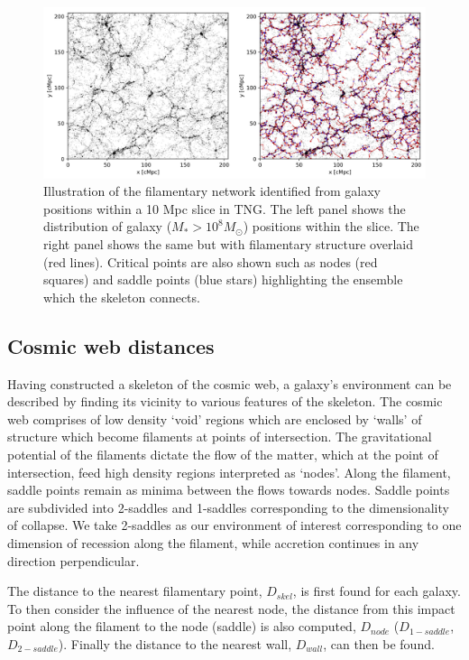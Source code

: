 \begin{figure}
	\includegraphics[width=\linewidth]{dyn_mod_files/TNG300-1-SM10-8-slice-galaxy-density-skeleton-comparison.png}
    \caption{Illustration of the filamentary network identified from galaxy positions within a 10 Mpc slice in TNG. The left panel shows the distribution of galaxy ($M_{\ast} > 10^{8}M_{\odot}$) positions within the slice. The right panel shows the same but with filamentary structure overlaid (red lines). Critical points are also shown such as nodes (red squares) and saddle points (blue stars) highlighting the ensemble which the skeleton connects.}
    \label{fig:disperse_TNG300}
\end{figure}


\subsection{Cosmic web distances}
Having constructed a skeleton of the cosmic web, a galaxy's environment can be described by finding its vicinity to various features of the skeleton. The cosmic web comprises of low density `void' regions which are enclosed by `walls' of structure which become filaments at points of intersection. The gravitational potential of the filaments dictate the flow of the matter, which at the point of intersection, feed high density regions interpreted as `nodes'. Along the filament, saddle points remain as minima between the flows towards nodes. Saddle points are subdivided into 2-saddles and 1-saddles corresponding to the dimensionality of collapse. We take 2-saddles as our environment of interest corresponding to one dimension of recession along the filament, while accretion continues in any direction perpendicular. 

The distance to the nearest filamentary point, $D_{skel}$, is first found for each galaxy. To then consider the influence of the nearest node, the distance from this impact point along the filament to the node (saddle) is also computed, $D_{node}$ ($D_{1-saddle}$,$D_{2-saddle}$). Finally the distance to the nearest wall, $D_{wall}$, can then be found. 

